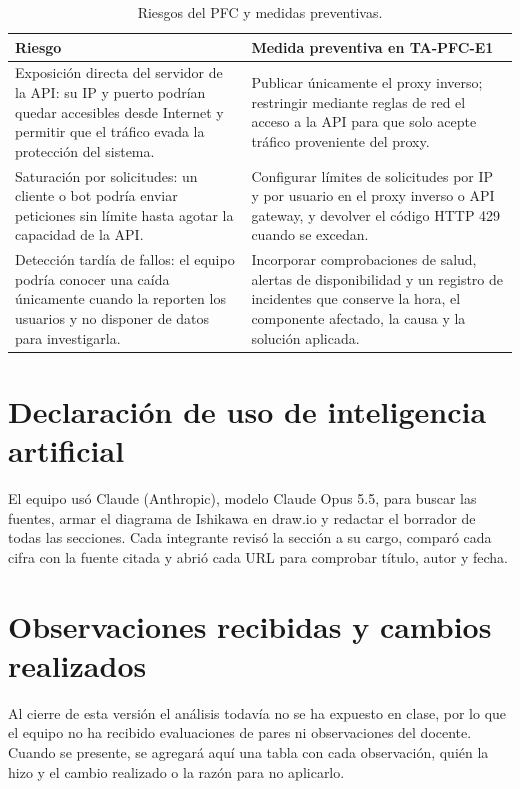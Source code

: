 \documentclass[11pt,a4paper]{article}
\begin{document}
\begin{table}[H]
  \centering
  \caption{Riesgos del PFC y medidas preventivas.}
  \label{tab:lecciones}
  \small
  \begin{tabularx}{\textwidth}{XX}
    \toprule
    Riesgo & Medida preventiva en TA-PFC-E1 \\
    \midrule
    Exposición directa del servidor de la API: su IP y puerto podrían quedar accesibles desde Internet y permitir que el tráfico evada la protección del sistema. & Publicar únicamente el proxy inverso; restringir mediante reglas de red el acceso a la API para que solo acepte tráfico proveniente del proxy. \\
    Saturación por solicitudes: un cliente o bot podría enviar peticiones sin límite hasta agotar la capacidad de la API. & Configurar límites de solicitudes por IP y por usuario en el proxy inverso o API gateway, y devolver el código HTTP 429 cuando se excedan. \\
    Detección tardía de fallos: el equipo podría conocer una caída únicamente cuando la reporten los usuarios y no disponer de datos para investigarla. & Incorporar comprobaciones de salud, alertas de disponibilidad y un registro de incidentes que conserve la hora, el componente afectado, la causa y la solución aplicada. \\
    \bottomrule
  \end{tabularx}
\end{table}

\section*{Declaración de uso de inteligencia artificial}
El equipo usó Claude (Anthropic), modelo Claude Opus 5.5, para buscar las fuentes, armar el diagrama de Ishikawa en draw.io y redactar el borrador de todas las secciones. Cada integrante revisó la sección a su cargo, comparó cada cifra con la fuente citada y abrió cada URL para comprobar título, autor y fecha.

\printbibliography[title={Referencias}]

\section*{Observaciones recibidas y cambios realizados}
Al cierre de esta versión el análisis todavía no se ha expuesto en clase, por lo que el equipo no ha recibido evaluaciones de pares ni observaciones del docente. Cuando se presente, se agregará aquí una tabla con cada observación, quién la hizo y el cambio realizado o la razón para no aplicarlo.
\end{document}
